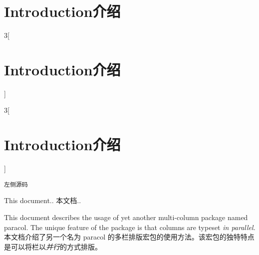 
\section{Introduction\hfill 介绍}

\begin{paracol}{3}[\section{Introduction\hfill 介绍}]
\begin{VerbatimII}
\begin{paracol}{3}[\section{Introduction\hfill 介绍}]
\begin{Verbatim}
左侧源码
\end{Verbatim}
\switchcolumn
This document..
\switchcolumn
本文档..
\end{paracol}    
\end{VerbatimII}
\switchcolumn
 This document describes the usage of yet another multi-column package named
 \textsf{paracol}.  The unique feature of the package is that columns are
 typeset {\em in parallel.}
\switchcolumn
 本文档介绍了另一个名为 \textsf{paracol} 的多栏排版宏包的使用方法。该宏包的独特特点是可以将栏以{\em 并行}的方式排版。 


\end{paracol}


